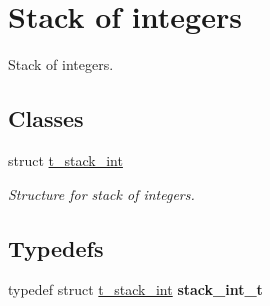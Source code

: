 \hypertarget{group__integer__stack}{}\section{Stack of integers}
\label{group__integer__stack}


Stack of integers.  


\subsection*{Classes}
\begin{DoxyCompactItemize}
\item 
struct \hyperlink{structt__stack__int}{t\+\_\+stack\+\_\+int}
\begin{DoxyCompactList}\small\item\em Structure for stack of integers. \end{DoxyCompactList}\end{DoxyCompactItemize}
\subsection*{Typedefs}
\begin{DoxyCompactItemize}
\item 
typedef struct \hyperlink{structt__stack__int}{t\+\_\+stack\+\_\+int} {\bfseries stack\+\_\+int\+\_\+t}\hypertarget{group__integer__stack_ga84e3a9a650bddbb74d7eb9d4eb61ebb7}{}\label{group__integer__stack_ga84e3a9a650bddbb74d7eb9d4eb61ebb7}

\end{DoxyCompactItemize}
